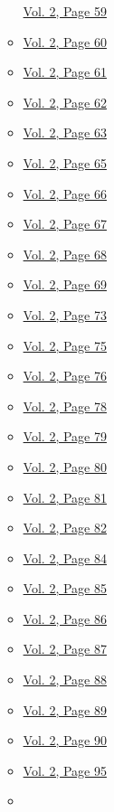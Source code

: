 \begin{itemize}
\begin{itemize}
    \protect\hyperlink{g-page-271}{Vol. 2, Page 59}
  \item
    \protect\hyperlink{g-page-272}{Vol. 2, Page 60}
  \item
    \protect\hyperlink{g-page-273}{Vol. 2, Page 61}
  \item
    \protect\hyperlink{g-page-274}{Vol. 2, Page 62}
  \item
    \protect\hyperlink{g-page-275}{Vol. 2, Page 63}
  \item
    \protect\hyperlink{g-page-277}{Vol. 2, Page 65}
  \item
    \protect\hyperlink{g-page-278}{Vol. 2, Page 66}
  \item
    \protect\hyperlink{g-page-279}{Vol. 2, Page 67}
  \item
    \protect\hyperlink{g-page-280}{Vol. 2, Page 68}
  \item
    \protect\hyperlink{g-page-281}{Vol. 2, Page 69}
  \item
    \protect\hyperlink{g-page-285}{Vol. 2, Page 73}
  \item
    \protect\hyperlink{g-page-287}{Vol. 2, Page 75}
  \item
    \protect\hyperlink{g-page-288}{Vol. 2, Page 76}
  \item
    \protect\hyperlink{g-page-290}{Vol. 2, Page 78}
  \item
    \protect\hyperlink{g-page-291}{Vol. 2, Page 79}
  \item
    \protect\hyperlink{g-page-292}{Vol. 2, Page 80}
  \item
    \protect\hyperlink{g-page-293}{Vol. 2, Page 81}
  \item
    \protect\hyperlink{g-page-294}{Vol. 2, Page 82}
  \item
    \protect\hyperlink{g-page-296}{Vol. 2, Page 84}
  \item
    \protect\hyperlink{g-page-297}{Vol. 2, Page 85}
  \item
    \protect\hyperlink{g-page-298}{Vol. 2, Page 86}
  \item
    \protect\hyperlink{g-page-299}{Vol. 2, Page 87}
  \item
    \protect\hyperlink{g-page-300}{Vol. 2, Page 88}
  \item
    \protect\hyperlink{g-page-301}{Vol. 2, Page 89}
  \item
    \protect\hyperlink{g-page-302}{Vol. 2, Page 90}
  \item
    \protect\hyperlink{g-page-307}{Vol. 2, Page 95}
  \item

\end{itemize}
\end{itemize}

